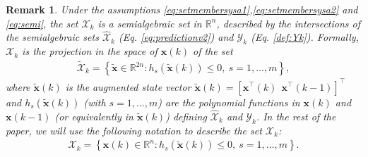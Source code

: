 \documentclass[twocolumn]{autart}
\newtheorem{remark}{Remark}{\normalfont}{\normalfont}
\newcommand{\xaug}{\tilde{\mathbf{x}}}
\begin{document}
\begin{remark}
 Under the assumptions \eqref{eq:setmembersysa1},\eqref{eq:setmembersysa2} and \eqref{eq:semi}, the set $\mathcal{X}_k$ is a semialgebraic set in $\mathbb{R}^{n}$,  described by the intersections of the semialgebraic sets $\hat{\mathcal{X}}_k$ (Eq. \eqref{eq:predictionv2}) and $\mathcal{Y}_{k}$ (Eq. \eqref{def:Yk}). Formally,  $\mathcal{X}_k$ is the projection in the space of $\mathbf{x}(k)$  of the set
 \begin{align} \label{def:Xkt}
 \tilde{\mathcal{X}}_k=\left\{\xaug \in \mathbb{R}^{2n}: h_s(\xaug (k)) \leq 0, \ s=1,\ldots,m\right\},
 \end{align}
  where $\xaug (k)$ is the augmented state vector $\xaug (k)=\left[\mathbf{x}^\top(k) \ \ \mathbf{x}^\top(k-1)\right]^\top$ and $h_s(\xaug (k))$ (with $s=1,\ldots,m$) are the polynomial functions in  $\mathbf{x}(k)$ and  $\mathbf{x}(k-1)$ (or equivalently in $\xaug (k)$) defining $\hat{\mathcal{X}}_k$  and $\mathcal{Y}_{k}$.
  In the rest of the paper, we will use the following   notation to describe the set $\mathcal{X}_k$:
 \begin{align} \label{def:Xk}
 \mathcal{X}_k=\left\{\mathbf{x}(k) \in \mathbb{R}^n: h_s(\xaug (k)) \leq 0, \ s=1,\ldots,m\right\}.
 \end{align}
 \end{remark}
\end{document}
